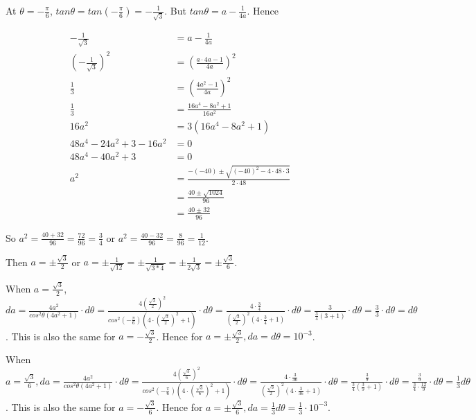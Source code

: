 \documentclass[9pt]{article}
\begin{document}
At $\theta = -\frac{\pi}{6}$, $tan \theta = tan (-\frac{\pi}{6}) = -\frac{1}{\sqrt{3}}$. But $tan \theta = a - \frac{1}{4a}$. Hence

\begin{align*}
  -\frac{1}{\sqrt{3}} &= a - \frac{1}{4a} \\
  (-\frac{1}{\sqrt{3}})^2 &= (\frac{a \cdot 4a - 1}{4a})^2 \\
  \frac{1}{3} &= (\frac{4a^2 - 1}{4a})^2 \\
  \frac{1}{3} &= \frac{16a^4 - 8a^2 + 1}{16a^2} \\
  16a^2 &= 3(16a^4 - 8a^2 + 1) \\
  48a^4 - 24a^2 + 3 - 16a^2 &= 0 \\
  48a^4 - 40a^2 + 3 &= 0 \\
  a^2 &= \frac{-(-40) \pm \sqrt{(-40)^2 - 4 \cdot 48 \cdot 3}}{2 \cdot 48} \\
      &= \frac{40 \pm \sqrt{1024}}{96} \\
      &= \frac{40 \pm 32}{96}
\end{align*}

So $a^2 = \frac{40 + 32}{96} = \frac{72}{96} = \frac{3}{4}$ or $a^2 = \frac{40 - 32}{96} = \frac{8}{96} = \frac{1}{12}$.

Then $a = \pm \frac{\sqrt{3}}{2}$ or $a = \pm \frac{1}{\sqrt{12}} = \pm \frac{1}{\sqrt{3 * 4}} = \pm \frac{1}{2 \sqrt{3}} = \pm \frac{\sqrt{3}}{6}$.

When $a = \frac{\sqrt{3}}{2}$, $da = \frac{4a^2}{cos^2 \theta (4a^2 + 1)} \cdot d \theta = \frac{4 (\frac{\sqrt{3}}{2})^2}{cos^2 (-\frac{\pi}{6}) (4 \cdot (\frac{\sqrt{3}}{2})^2 + 1)} \cdot d \theta = \frac{4 \cdot \frac{3}{4}}{(\frac{\sqrt{3}}{2})^2 (4 \cdot \frac{3}{4} + 1)} \cdot d \theta = \frac{3}{\frac{3}{4} (3 + 1)} \cdot d \theta = \frac{3}{3} \cdot d \theta = d \theta$. This is also the same for $a = -\frac{\sqrt{3}}{2}$. Hence for $a = \pm \frac{\sqrt{3}}{2}, da = d \theta = 10^{-3}$.

When $a = \frac{\sqrt{3}}{6}, da = \frac{4a^2}{cos^2 \theta (4a^2 + 1)} \cdot d \theta = \frac{4 (\frac{\sqrt{3}}{6})^2}{cos^2 (-\frac{\pi}{6}) (4 \cdot (\frac{\sqrt{3}}{6})^2 + 1)} \cdot d \theta = \frac{4 \cdot \frac{3}{36}}{(\frac{\sqrt{3}}{2})^2 (4 \cdot \frac{3}{36} + 1)} \cdot d \theta = \frac{\frac{3}{9}}{\frac{3}{4}(\frac{3}{9} + 1)} \cdot d \theta = \frac{\frac{3}{9}}{\frac{3}{4} \cdot \frac{12}{9}} \cdot d \theta = \frac{1}{3} d \theta$. This is also the same for $a = -\frac{\sqrt{3}}{6}$. Hence for $a = \pm \frac{\sqrt{3}}{6}, da = \frac{1}{3} d \theta = \frac{1}{3} \cdot 10^{-3}$.
\end{document}
